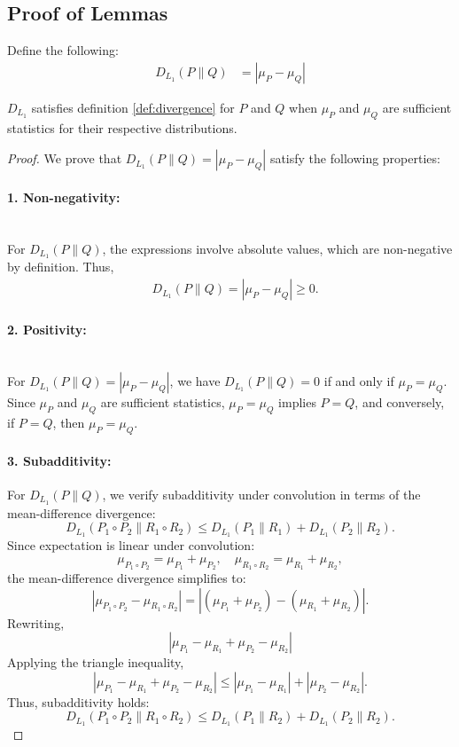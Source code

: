 \subsection{Proof of Lemmas}
\begin{lemma}
Define the following:
    \begin{align*}
        D_{L_1}(P \| Q) &= |\mu_P - \mu_Q|
    \end{align*}

    $D_{L_1}$ satisfies definition \ref{def:divergence} for $P$ and $Q$ when $\mu_P$ and $\mu_Q$ are sufficient statistics for their respective distributions. 
\end{lemma}
\begin{proof}
We prove that $D_{L_1}(P \| Q) = |\mu_P - \mu_Q|$ satisfy the following properties:

\paragraph{1. Non-negativity:} \\
For $D_{L_1}(P \| Q)$, the expressions involve absolute values, which are non-negative by definition. Thus,
\begin{align}
&D_{L_1}(P \| Q) = |\mu_P - \mu_Q| \geq 0.
\end{align}

\paragraph{2. Positivity:} \\
For $D_{L_1}(P \| Q) = |\mu_P - \mu_Q|$, we have $D_{L_1}(P \| Q) = 0$ if and only if $\mu_P = \mu_Q$. Since $\mu_P$ and $\mu_Q$ are sufficient statistics, $\mu_P = \mu_Q$ implies $P = Q$, and conversely, if $P = Q$, then $\mu_P = \mu_Q$.


\paragraph{3. Subadditivity:}
For \( D_{L_1}(P \| Q) \), we verify subadditivity under convolution in terms of the mean-difference divergence:
\[
D_{L_1}(P_1 \circ P_2 \| R_1 \circ R_2) \leq D_{L_1}(P_1 \| R_1 ) + D_{L_1}(P_2 \| R_2).
\]
Since expectation is linear under convolution:
\[
\mu_{P_1 \circ P_2} = \mu_{P_1} + \mu_{P_2},  \quad \mu_{R_1 \circ R_2} = \mu_{R_1} + \mu_{R_2},
\]
the mean-difference divergence simplifies to:
\[
|\mu_{P_1 \circ P_2} - \mu_{R_1 \circ R_2}|
= |(\mu_{P_1} + \mu_{P_2}) - (\mu_{R_1} + \mu_{R_2})|.
\]
Rewriting,
\[
|\mu_{P_1} - \mu_{R_1} + \mu_{P_2} - \mu_{R_2}|
\]
Applying the triangle inequality,
\[
|\mu_{P_1} - \mu_{R_1} + \mu_{P_2} - \mu_{R_2}| \leq |\mu_{P_1} - \mu_{R_1}| + |\mu_{P_2} - \mu_{R_2}|.
\]
Thus, subadditivity holds:
\[
D_{L_1}(P_1 \circ P_2 \| R_1 \circ R_2) \leq D_{L_1}(P_1  \| R_2) + D_{L_1}(P_2 \| R_2).
\]



\end{proof}
